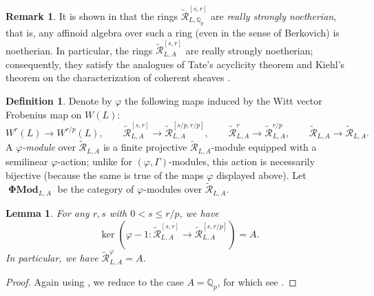 \documentclass[12pt]{amsart}
\newtheorem{lemma}[theorem]{Lemma}
\theoremstyle{definition}
\newtheorem{defn}[theorem]{Definition}
\newtheorem{remark}[theorem]{Remark}
\numberwithin{equation}{theorem}
\newcommand{\QQ}{\mathbb{Q}}
\newcommand{\calR}{\mathcal{R}}
\DeclareMathOperator{\PhiMod}{\mathbf{\Phi Mod}}
\begin{document}
\begin{remark} \label{R:glueing lemma}
It is shown in \cite[Theorem~3.2]{kedlaya-noetherian} that the rings $\tilde{\calR}^{[s,r]}_{L,\QQ_p}$ are \emph{really strongly noetherian}, that is, any affinoid algebra over such a ring (even in the sense of Berkovich) is noetherian. In particular, the rings $\tilde{\calR}^{[s,r]}_{L,A}$ are really strongly noetherian; consequently, they satisfy the analogues of Tate's acyclicity theorem
\cite[Theorem~7.14, Theorem~8.3]{kedlaya-adic}
and Kiehl's theorem on the characterization of coherent sheaves
\cite[Theorem~8.16]{kedlaya-adic}.
\end{remark}

\begin{defn}
Denote by $\varphi$ the following maps induced by the Witt vector Frobenius map on $W(L)$:
\[
W^r(L) \to W^{r/p}(L), \qquad
\tilde{\calR}^{[s,r]}_{L,A} \to \tilde{\calR}^{[s/p,r/p]}_{L,A},
\qquad
\tilde{\calR}^{r}_{L,A} \to \tilde{\calR}^{r/p}_{L,A}, \qquad
\tilde{\calR}_{L,A} \to \tilde{\calR}_{L,A}.
\]
A \emph{$\varphi$-module} over $\tilde{\calR}_{L,A}$ is a finite projective $\tilde{\calR}_{L,A}$-module equipped with a semilinear $\varphi$-action; unlike for $(\varphi, \Gamma)$-modules, this action is necessarily bijective (because the same is true of the maps $\varphi$ displayed above).
Let $\PhiMod_{L,A}$ be the category of $\varphi$-modules over $\tilde{\calR}_{L,A}$.
\end{defn}

\begin{lemma} \label{L:phi invariants}
For any $r,s$ with $0 < s \leq r/p$, we have
\[
\ker(\varphi-1: \tilde{\calR}^{[s,r]}_{L,A} \to \tilde{\calR}^{[s,r/p]}_{L,A}) = A.
\]
In particular, we have $\tilde{\calR}_{L,A}^{\varphi} = A$.
\end{lemma}
\begin{proof}
Again using \cite[Lemma~2.2.9(b)]{kedlaya-liu1}, we reduce to the case $A = \QQ_p$,
for which see \cite[Corollary~5.2.4]{kedlaya-liu1}. 
\end{proof}
\end{document}
